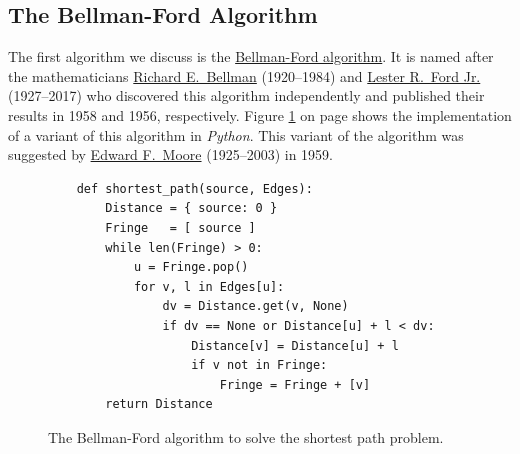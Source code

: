 \subsection{The Bellman-Ford Algorithm}
The first algorithm we discuss is the
\href{https://en.wikipedia.org/wiki/Bellman-Ford_algorithm}{Bellman-Ford algorithm}.
It is named after the mathematicians 
\href{https://en.wikipedia.org/wiki/Richard_E._Bellman}{Richard E.~Bellman} (1920--1984) \cite{bellman:58} and
\href{https://en.wikipedia.org/wiki/L._R._Ford_Jr.}{Lester R.~Ford Jr.} (1927--2017) \cite{ford:56}
who discovered this algorithm
independently and published their results in 1958 and 1956, respectively.  Figure
\ref{fig:Moore.ipynb} on page \pageref{fig:Moore.ipynb} shows the implementation of a variant of this 
algorithm in \textsl{Python}.  This variant of the algorithm was suggested by 
\href{https://en.wikipedia.org/wiki/Edward_F._Moore}{Edward F.~Moore} (1925--2003) 
\cite{moore:59}  in 1959.


\begin{figure}[!ht]
  \centering
\begin{verbatim}
    def shortest_path(source, Edges):
        Distance = { source: 0 }
        Fringe   = [ source ]
        while len(Fringe) > 0:
            u = Fringe.pop()
            for v, l in Edges[u]:
                dv = Distance.get(v, None)
                if dv == None or Distance[u] + l < dv:
                    Distance[v] = Distance[u] + l
                    if v not in Fringe: 
                        Fringe = Fringe + [v] 
        return Distance
\end{verbatim}
\vspace*{-0.3cm}
  \caption{The Bellman-Ford algorithm to solve the shortest path problem.}
  \label{fig:Moore.ipynb}
\end{figure} 

